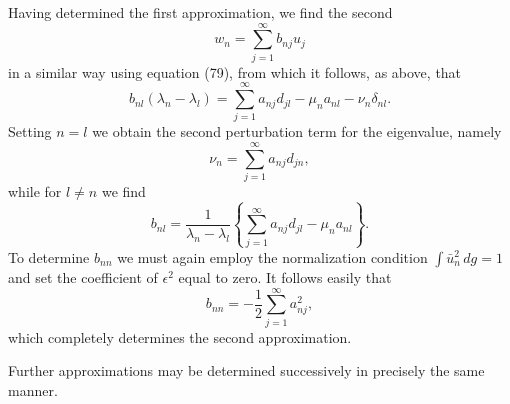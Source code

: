 Having determined the first approximation, we find the second
\[
w_n=\sum_{j=1}^{\infty}b_{nj}u_j
\]
in a similar way using equation (79), from which it follows, as above, that
\begin{equation}
b_{nl}(\lambda_n-\lambda_l)=\sum_{j=1}^{\infty}a_{nj}d_{jl}-\mu_na_{nl}-\nu_n\delta_{nl}.
\tag{82}
\end{equation}
Setting $n=l$ we obtain the second perturbation term for the eigenvalue, namely
\[
\nu_n=\sum_{j=1}^{\infty}a_{nj}d_{jn},
\]
while for $l\ne n$ we find
\begin{equation}
b_{nl}=\frac1{\lambda_n-\lambda_l}\left\{\sum_{j=1}^{\infty}a_{nj}d_{jl}-\mu_na_{nl}\right\}.
\tag{83}
\end{equation}
To determine $b_{nn}$ we must again employ the normalization condition $\int \bar u_n^2\,dg=1$ and set the coefficient of $\epsilon^2$ equal to zero. It follows easily that
\begin{equation}
b_{nn}=-\frac12\sum_{j=1}^{\infty}a_{nj}^2,
\tag{84}
\end{equation}
which completely determines the second approximation.

Further approximations may be determined successively in precisely the same manner.

